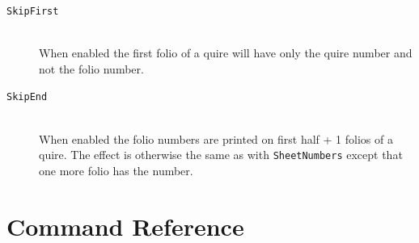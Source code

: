 \documentclass[a4paper, 12pt]{article}
\newcommand{\feature}[1]{\texttt{#1}}
\begin{document}
\begin{description}
  \item [\feature{SkipFirst}] \mbox{} \\
    When enabled the first folio of a quire will have only the quire
    number and not the folio number. 


  \item [\feature{SkipEnd}] \mbox{} \\
    When enabled the folio numbers are printed on first half + 1
    folios of a quire. The effect is otherwise the same as with
    \feature{SheetNumbers} except that one more folio has the number.
\end{description}

\section{Command Reference}
\end{document}
